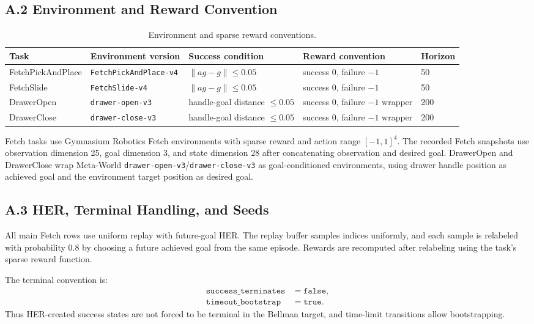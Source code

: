 \documentclass[letterpaper]{article}
\begin{document}
\subsection{A.2 Environment and Reward Convention}

\begin{table}[h]
\centering
\caption{Environment and sparse reward conventions.}
\label{tab:appendix-envs}
\begin{tabular}{@{}p{}p{}p{}p{}p{}@{}}
\toprule
Task & Environment version & Success condition & Reward convention & Horizon \\
\midrule
FetchPickAndPlace & \texttt{FetchPickAndPlace-v4} & \(\|ag-g\|\le 0.05\) & success \(0\), failure \(-1\) & 50 \\
FetchSlide & \texttt{FetchSlide-v4} & \(\|ag-g\|\le 0.05\) & success \(0\), failure \(-1\) & 50 \\
DrawerOpen & \texttt{drawer-open-v3} & handle-goal distance \(\le 0.05\) & success \(0\), failure \(-1\) wrapper & 200 \\
DrawerClose & \texttt{drawer-close-v3} & handle-goal distance \(\le 0.05\) & success \(0\), failure \(-1\) wrapper & 200 \\
\bottomrule
\end{tabular}
\end{table}

Fetch tasks use Gymnasium Robotics Fetch environments with sparse reward and action range \([-1,1]^4\). The recorded Fetch snapshots use observation dimension 25, goal dimension 3, and state dimension 28 after concatenating observation and desired goal. DrawerOpen and DrawerClose wrap Meta-World \texttt{drawer-open-v3}/\texttt{drawer-close-v3} as goal-conditioned environments, using drawer handle position as achieved goal and the environment target position as desired goal.

\subsection{A.3 HER, Terminal Handling, and Seeds}

All main Fetch rows use uniform replay with future-goal HER. The replay buffer samples indices uniformly, and each sample is relabeled with probability 0.8 by choosing a future achieved goal from the same episode. Rewards are recomputed after relabeling using the task's sparse reward function.

The terminal convention is:
\begin{equation}
\begin{aligned}
\texttt{success\_terminates}&=\texttt{false},\\
\texttt{timeout\_bootstrap}&=\texttt{true}.
\end{aligned}
\end{equation}
Thus HER-created success states are not forced to be terminal in the Bellman target, and time-limit transitions allow bootstrapping.
\end{document}
